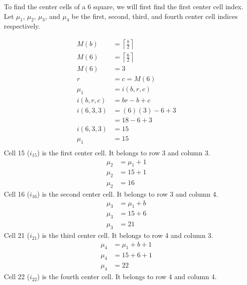\documentclass[letterpaper, twoside,12pt]{book}
\begin{document}
    To find the center cells of a 6 square, we will first find the first center cell index. Let $\mu_1$, $\mu_2$, $\mu_3$, and $\mu_4$ be the first, second, third, and fourth center cell indices respectively.

    \begin{equation}
        \begin{split}
            M(b) &= \left\lceil \frac{b}{2} \right\rceil \\
            M(6) &= \left\lceil \frac{6}{2} \right\rceil \\
            M(6) &= 3 \\
            r &= c = M(6) \\
            \mu_1 &= i(b,r,c) \\
            i(b,r,c) &= br - b + c \\
            i(6,3,3) &= (6)(3) - 6 + 3 \\
                &= 18 - 6 + 3 \\
            i(6,3,3) &= 15 \\
            \mu_1 &= 15 \\
        \end{split}
    \end{equation}
    Cell 15 ($i_{15}$) is the first center cell. It belongs to row 3 and column 3.
    \begin{equation}
        \begin{split}
            \mu_2 &= \mu_1 + 1 \\
            \mu_2 &= 15 + 1 \\
            \mu_2 &= 16 
        \end{split}
    \end{equation}
    Cell 16 ($i_{16}$) is the second center cell. It belongs to row 3 and column 4.
    \begin{equation}
        \begin{split}
            \mu_3 &= \mu_1 + b \\
            \mu_3 &= 15 + 6 \\
            \mu_3 &= 21 
        \end{split}
    \end{equation}
    Cell 21 ($i_{21}$) is the third center cell. It belongs to row 4 and column 3.
    \begin{equation}
        \begin{split}
            \mu_4 &= \mu_1 + b + 1 \\
            \mu_4 &= 15 + 6 + 1 \\
            \mu_4 &= 22
        \end{split}
    \end{equation}
    Cell 22 ($i_{22}$) is the fourth center cell. It belongs to row 4 and column 4.
\end{document}
